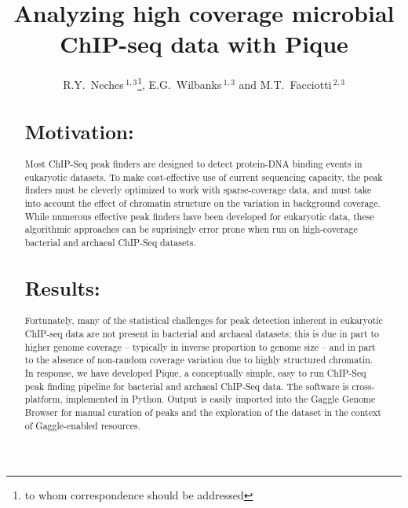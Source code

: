 \documentclass{bioinfo} %
\begin{document}

\title[In a fit of pique]{Analyzing high coverage microbial ChIP-seq
data with Pique} \author[Neches
\textit{et~al}]{R.Y.~Neches\,$^{1,3}$\footnote{to whom correspondence
should be addressed}, E.G.~Wilbanks\,$^{1,3}$ and
M.T.~Facciotti\,$^{2,3}$ \address{$^{1}$Microbiology Graduate Group,
University of California, Davis.\\ $^{2}$Department of Biomedical
Engineering, University of California, Davis.\\$^{3}$Genome Center,
University of California, Davis.}



\maketitle


\begin{abstract} \section{Motivation:}

Most ChIP-Seq peak finders are designed to detect protein-DNA binding
events in eukaryotic datasets. To make cost-effective use of current
sequencing capacity, the peak finders must be cleverly optimized to work
with sparse-coverage data, and must take into account the effect of
chromatin structure on the variation in background coverage. While
numerous effective peak finders have been developed for eukaryotic data,
these algorithmic approaches can be suprisingly error prone when run on
high-coverage bacterial and archaeal ChIP-Seq datasets.


\section{Results:} Fortunately, many of the statistical challenges for
peak detection inherent in eukaryotic ChIP-seq data are not present in
bacterial and archaeal datasets; this is due in part to higher genome
coverage -- typically in inverse proportion to genome size -- and in
part to the absence of non-random coverage variation due to highly
structured chromatin.  In response, we have developed Pique, a
conceptually simple, easy to run ChIP-Seq peak finding pipeline for
bacterial and archaeal ChIP-Seq data.  The software is cross-platform,
implemented in Python.  Output is easily imported into the Gaggle Genome
Browser for manual curation of peaks and the exploration of the dataset
in the context of Gaggle-enabled resources.


\end{abstract}}
\end{document}
